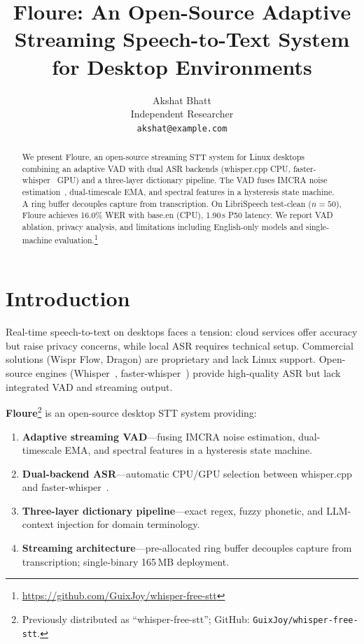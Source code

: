 \documentclass[11pt]{article}
\title{Floure: An Open-Source Adaptive Streaming Speech-to-Text System for Desktop Environments}
\author{
  Akshat Bhatt \\
  Independent Researcher \\
  \texttt{akshat@example.com}
}
\begin{document}
\maketitle
\vspace{-0.5cm}

\begin{abstract}
We present Floure, an open-source streaming STT system for Linux desktops combining an
adaptive VAD with dual ASR backends (whisper.cpp CPU, faster-whisper~\cite{faster_whisper}
GPU) and a three-layer dictionary pipeline. The VAD fuses IMCRA noise
estimation~\cite{cohen2003imcra}, dual-timescale EMA, and spectral features in a
hysteresis state machine. A ring buffer decouples capture from transcription. On
LibriSpeech test-clean ($n=50$), Floure achieves 16.0\% WER with base.en (CPU),
1.90\,s P50 latency. We report VAD ablation, privacy analysis, and limitations
including English-only models and single-machine evaluation.\footnote{\url{https://github.com/GuixJoy/whisper-free-stt}}
\end{abstract}

\section{Introduction}

Real-time speech-to-text on desktops faces a tension: cloud services offer accuracy but
raise privacy concerns, while local ASR requires technical setup. Commercial solutions
(Wispr Flow, Dragon) are proprietary and lack Linux support. Open-source engines
(Whisper~\cite{radford2023robust}, faster-whisper~\cite{faster_whisper}) provide
high-quality ASR but lack integrated VAD and streaming output.

\textbf{Floure}\footnote{Previously distributed as ``whisper-free-stt''; GitHub:
\texttt{GuixJoy/whisper-free-stt}.} is an open-source desktop STT system providing:

\begin{enumerate}
  \item \textbf{Adaptive streaming VAD}---fusing IMCRA noise estimation, dual-timescale
        EMA, and spectral features in a hysteresis state machine.
  \item \textbf{Dual-backend ASR}---automatic CPU/GPU selection between
        whisper.cpp~\cite{whisper_cpp} and faster-whisper~\cite{faster_whisper}.
  \item \textbf{Three-layer dictionary pipeline}---exact regex, fuzzy phonetic, and
        LLM-context injection for domain terminology.
  \item \textbf{Streaming architecture}---pre-allocated ring buffer decouples capture
        from transcription; single-binary 165\,MB deployment.
\end{enumerate}
\end{document}
